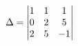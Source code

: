 \documentclass[preview]{standalone}
\begin{document}
\begin{align*}
\special{dvisvgm:raw <g id='unique000'>}\Delta = \begin{vmatrix} 1 & 1 & 1 \\ 0 & 2 & 5 \\ 2 & 5 & -1 \end{vmatrix}\special{dvisvgm:raw </g>}
\end{align*}
\end{document}
